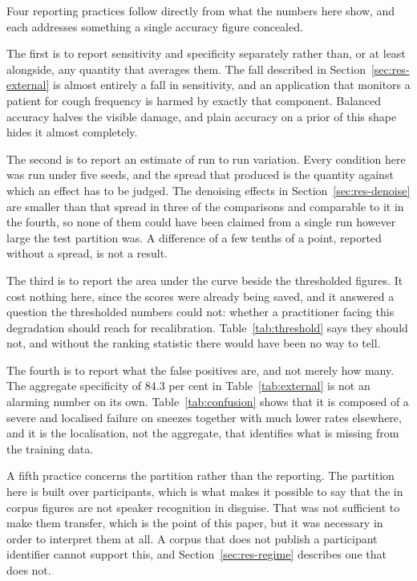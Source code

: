\documentclass[pdflatex,sn-mathphys-num]{sn-jnl}
\begin{document}
Four reporting practices follow directly from what the numbers here show, and each
addresses something a single accuracy figure concealed.

The first is to report sensitivity and specificity separately rather than, or at least
alongside, any quantity that averages them. The fall described in
Section~\ref{sec:res-external} is almost entirely a fall in sensitivity, and an
application that monitors a patient for cough frequency is harmed by exactly that
component. Balanced accuracy halves the visible damage, and plain accuracy on a prior of
this shape hides it almost completely.

The second is to report an estimate of run to run variation. Every condition here was run
under five seeds, and the spread that produced is the quantity against which an effect has
to be judged. The denoising effects in Section~\ref{sec:res-denoise} are smaller than that
spread in three of the comparisons and comparable to it in the fourth, so none of them
could have been claimed from a single run however large the test partition was. A
difference of a few tenths of a point, reported without a spread, is not a result.

The third is to report the area under the curve beside the thresholded figures. It cost
nothing here, since the scores were already being saved, and it answered a question the
thresholded numbers could not: whether a practitioner facing this degradation should
reach for recalibration. Table~\ref{tab:threshold} says they should not, and without the
ranking statistic there would have been no way to tell.

The fourth is to report what the false positives are, and not merely how many. The
aggregate specificity of $84.3$ per cent in Table~\ref{tab:external} is not an alarming
number on its own. Table~\ref{tab:confusion} shows that it is composed of a severe and
localised failure on sneezes together with much lower rates elsewhere, and it is the
localisation, not the aggregate, that identifies what is missing from the training data.

A fifth practice concerns the partition rather than the reporting. The partition here is
built over participants, which is what makes it possible to say that the in corpus figures
are not speaker recognition in disguise. That was not sufficient to make them transfer,
which is the point of this paper, but it was necessary in order to interpret them at all.
A corpus that does not publish a participant identifier cannot support this, and
Section~\ref{sec:res-regime} describes one that does not.
\end{document}
